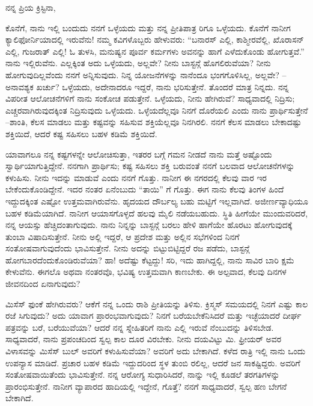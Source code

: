ನನ್ನ ಪ್ರಿಯ ಕ್ರಿಸ್ಟಿನಾ,

ಕೊನೆಗೆ, ನಾನು ಇಲ್ಲಿ ಬಂದುದು ನನಗೆ ಒಳ್ಳೆಯದು ಮತ್ತು ನನ್ನ ಪ್ರೀತಿಪಾತ್ರ ರಿಗೂ ಒಳ್ಳೆಯದು. ಕೊನೆಗೆ ನಾನೀಗ ಕ್ಯಾಲಿಫೋರ್ನಿಯಾದಲ್ಲಿ ಇರುವೆನು! ನಮ್ಮ ಕವಿಗಳೊಬ್ಬರು ಹೇಳುವರು: “ಬನಾರಸ್ ಎಲ್ಲಿ, ಕಾಶ್ಮೀರವೆಲ್ಲಿ, ಖೊರಾಸನ್ ಎಲ್ಲಿ, ಗುಜರಾತ್ ಎಲ್ಲಿ! ಓ ತುಳಸಿ, ಮನುಷ್ಯನ ಪೂರ್ವ ಕರ್ಮಗಳು ಅವನನ್ನು ಹಾಗೆ ಎಳೆದುಕೊಂಡು ಹೋಗುತ್ತವೆ.” ನಾನು ಇಲ್ಲಿರುವೆನು. ಎಲ್ಲಕ್ಕಿಂತ ಅದು ಒಳ್ಳೆಯದು, ಅಲ್ಲವೇ? ನೀನು ಬಾಸ್ಟನ್ಗೆ ಹೊಗಲಿರುವೆಯಾ? ನೀನು ಹೋಗುವುದಿಲ್ಲವೆಂದು ನನಗೆ ಅನ್ನಿಸುವುದು. ನಿನ್ನ ಯೋಜನೆಗಳನ್ನು ನಾನೆಂದೂ ಭಂಗಗೊಳಿಸಿಲ್ಲ, ಅಲ್ಲವೇ? – ಅನಾವಶ್ಯಕ ಖರ್ಚು? ಒಳ್ಳೆಯದು, ಅದೇನಾದರೂ ಇದ್ದರೆ, ನಾನು ಭರಿಸುತ್ತೇನೆ. ತೊಂದರೆ ಮಾತ್ರ ನಿನ್ನದು. ನನ್ನ ವಿಪರೀತ ಆಲೋಚನೆಗಳಿಗೆ ನಾನು ಸಂಕೋಚ ಪಡುತ್ತೇನೆ. ಒಳ್ಳೆಯದು, ನೀನು ಹೇಗಿರುವೆ? ಸಾಧ್ಯವಾದಲ್ಲಿ ನಿದ್ರಿಸು; ಎಚ್ಚರವಾಗಿರುವುದಕ್ಕಿಂತ ನಿದ್ರಿಸುವುದು ಒಳ್ಳೆಯದು. ಒಳ್ಳೆಯದೆಲ್ಲವೂ ನಿನಗೆ ದೊರೆಯಲಿ ಎಂದು ನಾನು ಪ್ರಾರ್ಥಿಸುತ್ತೇನೆ –ಶಾಂತಿ, ಕೆಲಸ ಮಾಡಲು ಮತ್ತು ಕಷ್ಟವನ್ನು ಸಹಿಸುವ ಶಕ್ತಿಯೆಲ್ಲವೂ ನಿನಗಿರಲಿ. ನನಗೆ ಕೆಲಸ ಮಾಡಲು ಬೇಕಾದಷ್ಟು ಶಕ್ತಿಯಿದೆ, ಆದರೆ ಕಷ್ಟ ಸಹಿಸಲು ಬಹಳ ಕಡಿಮೆ ಶಕ್ತಿಯಿದೆ.

ಯಾವಾಗಲೂ ನನ್ನ ಕಷ್ಟಗಳನ್ನೇ ಆಲೋಚಿಸುತ್ತಾ, ಇತರರ ಬಗ್ಗೆ ಗಮನ ನೀಡದೆ ನಾನು ಮತ್ತೆ ಅಷ್ಟೊಂದು ಸ್ವಾರ್ಥಿಯಾಗುತ್ತಿದ್ದೇನೆ. ನನಗಾಗಿ ಪ್ರಾರ್ಥಿಸು; ಕಷ್ಟ ಸಹಿಸಲು ಶಕ್ತಿ ಬರುವಂತೆ ನನಗೆ ಬಲವಾದ ಆಲೋಚನೆಗಳನ್ನು ಕಳುಹಿಸು. ನೀನು ಇದನ್ನು ಮಾಡುವೆ ಎಂದು ನನಗೆ ಗೊತ್ತು. ನಾನೀಗ ಈ ನಗರದಲ್ಲಿ ಕೆಲವು ವಾರ ಇರ ಬೇಕೆಂದುಕೊಂಡಿದ್ದೇನೆ. ಇದರ ನಂತರ ಏನೆಂಬುದು “ತಾಯಿ” ಗೆ ಗೊತ್ತು. ಈಗ ನಾನು ಕೆಲವು ತಿಂಗಳ ಹಿಂದೆ ಇದ್ದುದಕ್ಕಿಂತ ಎಷ್ಟೋ ಉತ್ತಮವಾಗಿರುವೆನು. ಹೃದಯದ ದೌರ್ಬಲ್ಯ ಬಹು ಮಟ್ಟಿಗೆ ಇಲ್ಲವಾಗಿದೆ. ಅಜೀರ್ಣವ್ಯಾಧಿಯೂ ಬಹಳ ಕಡಿಮೆಯಾಗಿದೆ. ನಾನೀಗ ಆಯಾಸಗೊಳ್ಳದೆ ಹಲವು ಮೈಲಿ ನಡೆಯಬಹುದು. ಸ್ಥಿತಿ ಹೀಗೆಯೇ ಮುಂದುವರಿದರೆ, ನನ್ನ ಆಯಸ್ಸು ಹೆಚ್ಚಿದಂತಾಗುವುದು. ನಾನು ನಿನ್ನನ್ನು ಬಾಸ್ಟನ್ಗೆ ಬರಲು ಹೇಳಿ ಹಾಗೆಯೇ ಹೊರಟು ಹೋಗುವುದಕ್ಕೆ ತುಂಬಾ ವಿಷಾದಿಸುತ್ತೇನೆ. ನೀನು ಅಲ್ಲಿ ಇದ್ದರೆ, ಆ ಪ್ರದೇಶ ಮತ್ತು ಅಲ್ಲಿನ ಸಭೆಗಳಿಂದ ನಿನಗೆ ಸಂತೋಷವಾಗುವುದೆಂದು ಭಾವಿಸುತ್ತೇನೆ. ನೀನು ಅದನ್ನು ಬಿಟ್ಟುಬಿಟ್ಟಿದ್ದರೆ ರಜ ಪಡೆದು, ಬಾಸ್ಟನ್ಗೆ ಹೋಗಬಾರದೆಂದುಕೊಂಡಿರುವೆಯಾ? ಹಾ! ಅದೆಷ್ಟು ಕೆಟ್ಟದ್ದು! ಸರಿ, ಇದು ಹಾಗಿದ್ದಲ್ಲಿ, ನಾನು ಸಾವಿರ ಬಾರಿ ಕ್ಷಮೆ ಕೇಳುವೆನು. ಈಗಲೊ ಅಥವಾ ನಂತರವೊ, ಭವಿಷ್ಯ ಉತ್ತಮವಾಗಿ ಕಾಣಬೇಕು. ಈ ಅಲ್ಪವಾದ, ಕೆಲವು ದಿನಗಳ ಜೀವನದಿಂದ ಏನಾಗುವುದು?

ಮಿಸೆಸ್ ಫುಂಕೆ ಹೇಗಿರುವರು? ಆಕೆಗೆ ನನ್ನ ಒಂದು ರಾಶಿ ಪ್ರೀತಿಯನ್ನು ತಿಳಿಸು. ಕ್ರಿಸ್ಮಸ್ ಸಮಯದಲ್ಲಿ ನಿನಗೆ ಎಷ್ಟು ಕಾಲ ರಜೆ ಸಿಗುವುದು? ಅದು ಯಾವಾಗ ಪ್ರಾರಂಭವಾಗುವುದು? ನಿನಗೆ ಬರೆಯಬೇಕೆನಿಸಿದರೆ ಮತ್ತು ಇಚ್ಛೆಯಾದರೆ ದೀರ್ಘ ಪತ್ರವನ್ನು ಬರೆ, ಬರೆಯುವೆಯಾ? ಆದರೆ ನನ್ನ ಸ್ನೇಹಿತರಿಗೆ ನಾನು ಎಲ್ಲಿ ಇರುವೆ ನೆಂಬುದನ್ನು ತಿಳಿಸಬೇಡ. ಸಾಧ್ಯವಾದರೆ, ನಾನು ಪ್ರಪಂಚದಿಂದ ಸ್ವಲ್ಪ ಕಾಲ ದೂರ ವಿರಬೇಕು. ನೀನು ದಯವಿಟ್ಟು ಮಿ. ಫ್ರೀಯರ್ ಅವರ ವಿಳಾಸವನ್ನು ಮಿಸೆಸ್ ಬುಲ್ ಅವರಿಗೆ ಕಳುಹಿಸುವೆಯಾ? ಅವರಿಗೆ ಅದು ಬೇಕಾಗಿದೆ. ಕಳೆದ ರಾತ್ರಿ ಇಲ್ಲಿ ನಾನು ಒಂದು ಉಪನ್ಯಾಸ ಮಾಡಿದೆ. ಪ್ರಚಾರ ಬಹಳ ಕಡಿಮೆ ಇದ್ದುದರಿಂದ ಸ್ಥಳ ತುಂಬಿ ರಲಿಲ್ಲ, ಆದರೆ ಜನ ಸಾಕಷ್ಟಿದ್ದರು. ಅವರಿಗೆ ಸಂತೋಷವಾಯಿತೆಂದು ಭಾವಿಸುತ್ತೇನೆ. ನನ್ನ ಆರೋಗ್ಯ ಸುಧಾರಿಸಿದರೆ, ನಾನ್ನು ಇಲ್ಲಿ ಕೂಡಲೆ ತರಗತಿಗಳನ್ನು ಪ್ರಾರಂಭಿಸುತ್ತೇನೆ. ನಾನೀಗ ವ್ಯಾಪಾರದ ಹಾದಿಯಲ್ಲಿ ಇದ್ದೇನೆ, ಗೊತ್ತೆ? ನನಗೆ ಸಾಧ್ಯವಾದರೆ, ಸ್ವಲ್ಪ ಹಣ ಬೇಗನೆ ಬೇಕಾಗಿದೆ.


